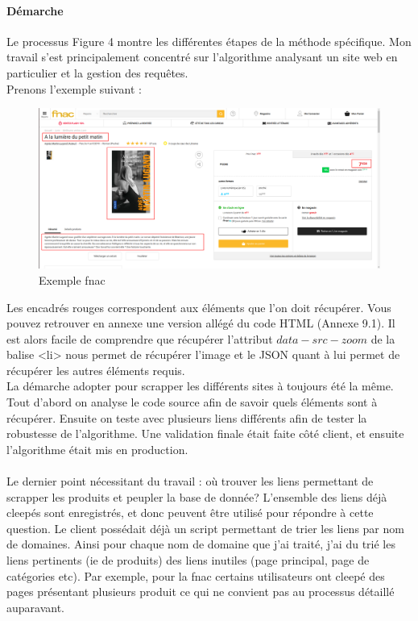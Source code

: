 \documentclass{article} %
\begin{document}
\paragraph{Démarche\\}
Le processus Figure 4 montre les différentes étapes de la méthode spécifique. Mon travail s'est principalement concentré sur l'algorithme analysant un site web en particulier et la gestion des requêtes.\\
Prenons l'exemple suivant \cite{fnac} :
\begin{figure}[!h]
	\centering
	\includegraphics[keepaspectratio = true,scale=0.25]{fnac.png}
	\caption{Exemple fnac}
\end{figure}
Les encadrés rouges correspondent aux éléments que l'on doit récupérer. Vous pouvez retrouver en annexe une version allégé du code HTML (Annexe 9.1). Il est alors facile de comprendre que récupérer l'attribut $data-src-zoom$ de la balise <li> nous permet de récupérer l'image et le JSON quant à lui permet de récupérer les autres éléments requis.\\
La démarche adopter pour scrapper les différents sites à toujours été la même. Tout d'abord on analyse le code source afin de savoir quels éléments sont à récupérer. Ensuite on teste avec plusieurs liens différents afin de tester la robustesse de l'algorithme. Une validation finale était faite côté client, et ensuite l'algorithme était mis en production.\\ \\
Le dernier point nécessitant du travail : où trouver les liens permettant de scrapper les produits et peupler la base de donnée? L'ensemble des liens déjà cleepés sont enregistrés, et donc peuvent être utilisé pour répondre à cette question. Le client possédait déjà un script permettant de trier les liens par nom de domaines. Ainsi pour chaque nom de domaine que j'ai traité, j'ai du trié les liens pertinents (ie de produits) des liens inutiles (page principal, page de catégories etc). Par exemple, pour la fnac certains utilisateurs ont cleepé des pages présentant plusieurs produit \cite{mve} ce qui ne convient pas au processus détaillé auparavant.
\end{document}

